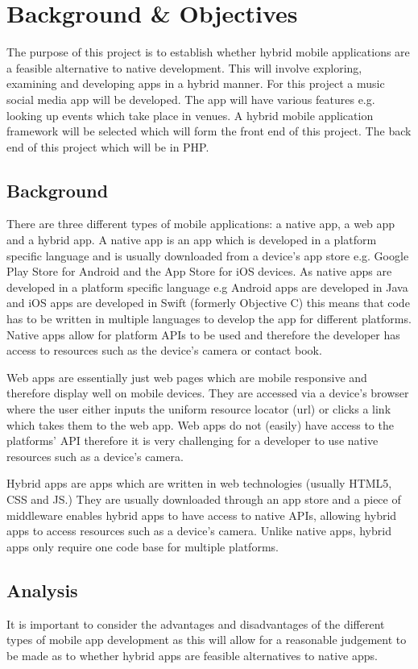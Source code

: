 \chapter{Background \& Objectives}

The purpose of this project is to establish whether hybrid mobile applications are a feasible alternative to native development. This will involve exploring, examining and developing apps in a hybrid manner. For this project a music social media app will be developed. The app will have various features e.g. looking up events which take place in  venues. A hybrid mobile application framework will be selected which will form the front end of this project. The back end of this project which will be in PHP.

\section{Background}
There are three different types of mobile applications: a native app, a web app and a hybrid app. A native app is an app which is developed in a platform specific language and is usually downloaded from a device's app store e.g. Google Play Store for Android and the App Store for iOS devices. As  native apps are developed in a platform specific language e.g Android apps are developed in Java and iOS apps are developed in Swift (formerly Objective C) this means that  code has to be written in multiple languages to develop the app for different platforms. Native apps allow for platform APIs to be used and therefore the developer has access to resources such as the device's camera or contact book. 

Web apps are essentially just web pages which are mobile responsive and therefore display well on mobile devices. They are accessed via a device's browser where the user either inputs the uniform resource locator (url) or clicks a link which takes them to the web app. Web apps do not (easily) have access to the platforms' API therefore it is very challenging for a developer to use native resources such as a device's camera. 

Hybrid apps are apps which are written in web technologies (usually HTML5, CSS and JS.) They are usually downloaded through an app store and a piece of middleware enables hybrid apps to have access to native APIs, allowing hybrid apps to access resources such as a device's camera. Unlike native apps, hybrid apps only require one code base for multiple platforms.

\section{Analysis}
It is important to consider the advantages and disadvantages of the different types of mobile app development as this will allow for a reasonable judgement to be made as to whether hybrid apps are feasible alternatives to native apps.

